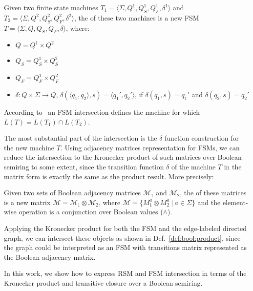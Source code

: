 \begin{definition}
\label{def:fsm:intersection}
Given two finite state machines $T_1 = \langle \Sigma, Q^1, Q_S^1, Q_F^1, \delta^1 \rangle$ and $T_2 = \langle \Sigma, Q^2, Q_S^2, Q_F^2, \delta^2 \rangle$, the  of these two machines is a new FSM $T = \langle \Sigma, Q, Q_S, Q_F, \delta \rangle$, where:
\begin{itemize}
    \item $Q = Q^1 \times Q^2$
    \item $Q_S = Q_S^1 \times Q_S^2$
    \item $Q_F = Q_F^1 \times Q_F^2$
    \item $\delta: Q \times \Sigma \to Q$,
    $\delta (\langle q_1, q_2 \rangle, s) = \langle q_1', q_2' \rangle$, if $\delta(q_1,s)=q_1'$ and $\delta(q_2,s)=q_2'$
\end{itemize}
\end{definition}

According to~\cite{automata:theory:10.5555/1177300} an FSM intersection defines the machine for which $L(T) = L(T_1) \cap L(T_2)$.

The most substantial part of the intersection is the $\delta$ function construction for the new machine $T$.
Using adjacency matrices representation for FSMs, we can reduce the intersection to the Kronecker product of such matrices over Boolean semiring to some extent, since the transition function $\delta$ of the machine $T$ in the matrix form is exactly the same as the product result.
More precisely:

\begin{definition}
\label{def:bool:product}
Given two sets of Boolean adjacency matrices $\mathcal{M}_1$ and $\mathcal{M}_2$, the  of these matrices is a new matrix
$\mathcal{M} = \mathcal{M}_1 \otimes \mathcal{M}_2$, where $\mathcal{M} = \{ M_1^a \otimes M_2^a~|~a \in \Sigma \}$ and the element-wise operation is a conjunction over Boolean values ($\wedge$).
\end{definition}

Applying the Kronecker product for both the FSM and the edge-labeled directed graph, we can intersect these objects as shown in Def.~\ref{def:bool:product}, since the graph could be interpreted as an FSM with transitions matrix represented as the Boolean adjacency matrix.

In this work, we show how to express RSM and FSM intersection in terms of
the Kronecker product and transitive closure over a Boolean semiring.